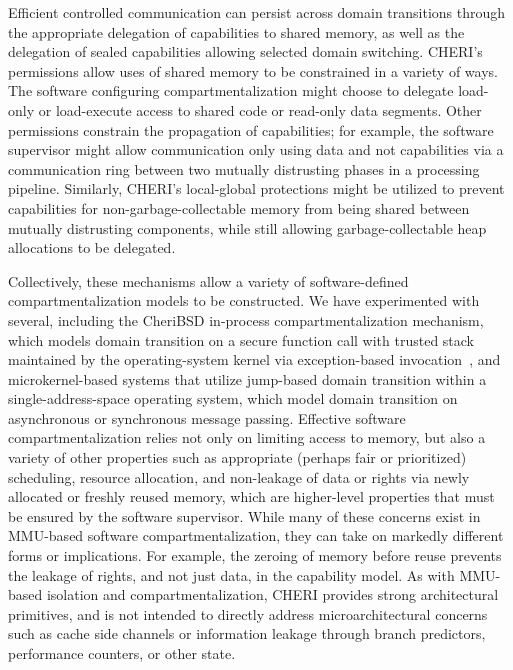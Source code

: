 Efficient controlled communication can persist across domain transitions
through the appropriate delegation of capabilities to shared memory, as well
as the delegation of sealed capabilities allowing selected domain switching.
CHERI's permissions allow uses of shared memory to be constrained in a
variety of ways.
The software configuring compartmentalization might choose to delegate
load-only or load-execute access to shared code or read-only data segments.
Other permissions constrain the propagation of capabilities; for example, the
software supervisor might allow communication only using data and not
capabilities via a communication ring between two mutually distrusting phases
in a processing pipeline.
Similarly, CHERI's local-global protections might be utilized to prevent
capabilities for non-garbage-collectable memory from being shared between
mutually distrusting components, while still allowing garbage-collectable heap
allocations to be delegated.

Collectively, these mechanisms allow a variety of software-defined
compartmentalization models to be constructed.
We have experimented with several, including the CheriBSD in-process
compartmentalization mechanism, which models domain transition on a secure
function call with trusted stack maintained by the operating-system kernel
via exception-based invocation~\cite{watson15:cheri,watson2016:microjournal},
and microkernel-based systems that utilize jump-based domain transition within
a single-address-space operating system, which model domain transition on
asynchronous or synchronous message passing.
Effective software compartmentalization relies not only on limiting access to
memory, but also a variety of other properties such as appropriate (perhaps
fair or prioritized) scheduling, resource allocation, and non-leakage of data
or rights via newly allocated or freshly reused memory, which are higher-level
properties that must be ensured by the software supervisor.
While many of these concerns exist in MMU-based software compartmentalization,
they can take on markedly different forms or implications.
For example, the zeroing of memory before reuse prevents the leakage of
rights, and not just data, in the capability model.
As with MMU-based isolation and compartmentalization, CHERI provides strong
architectural primitives, and is not intended to directly address
microarchitectural concerns such as cache side channels or information leakage
through branch predictors, performance counters, or other state.

